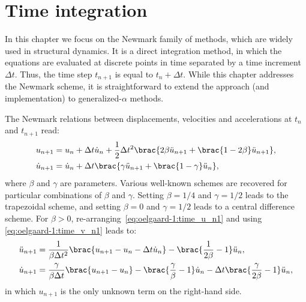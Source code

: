 \section{Time integration}
\label{sec:oelgaard-1:time_integration}

In this chapter we focus on the Newmark family of methods, which are
widely used in structural dynamics.  It is a direct integration method,
in which the equations are evaluated at discrete points in time separated
by a time increment $\Delta t$.  Thus, the time step $t_{n + 1}$ is equal
to $t_{n} + \Delta t$.  While this chapter addresses the Newmark scheme,
it is straightforward to extend the approach (and implementation) to
generalized-$\alpha$ methods.

The Newmark relations between displacements, velocities and accelerations
at $t_{n}$ and $t_{n + 1}$ read:
%
\begin{align}
\label{eq:oelgaard-1:time_u_n1}
  u_{n + 1} &= u_{n} + \Delta t \dot{u}_{n} +
              \frac{1}{2}\Delta t^2 \brac{2\beta \ddot{u}_{n + 1} +
                \brac{1 - 2\beta}\Ddot{u}_{n + 1} },
\\
\label{eq:oelgaard-1:time_v_n1}
\dot{u}_{n + 1} &= \dot{u}_{n} + \Delta t \brac{\gamma \ddot{u}_{n + 1} +
                    \brac{1 - \gamma} \ddot{u}_{n}},
\end{align}
%
where $\beta$ and $\gamma$ are parameters.  Various well-known schemes are
recovered for particular combinations of $\beta$ and $\gamma$. Setting
$\beta = 1/4$ and $\gamma = 1/2$ leads to the trapezoidal scheme, and
setting $\beta = 0$ and $\gamma = 1/2$ leads to a central difference
scheme.  For $\beta > 0$, re-arranging~\eqref{eq:oelgaard-1:time_u_n1}
and using \eqref{eq:oelgaard-1:time_v_n1} leads to:
%
\begin{align}
\label{eq:oelgaard-1:time_a_n1}
\Ddot{u}_{n + 1} &= \frac{1}{\beta \Delta t^2}
                      \brac{u_{n + 1} - u_{n} - \Delta t \dot{u}_{n}} -
                      \brac{\frac{1}{2\beta} - 1} \ddot{u}_{n},
\\
\label{eq:oelgaard-1:time_v(u)_n1}
 \dot{u}_{n + 1} &= \frac{\gamma}{\beta \Delta t}
                      \brac{u_{n + 1} - u_{n}} -
                      \brac{\frac{\gamma}{\beta} - 1} \dot{u}_{n} -
                      \Delta t \brac{\frac{\gamma}{2\beta} - 1} \ddot{u}_{n},
\end{align}
%
in which $u_{n+1}$ is the only unknown term on the right-hand side.


